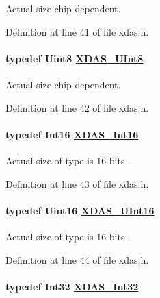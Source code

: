 Actual size chip dependent. 

Definition at line 41 of file xdas.h.\hypertarget{group__ti__xdais___x_d_a_s_gc9308edb855a360c27a47aaa6f3b39a9}{
\paragraph[XDAS\_\-UInt8]{\setlength{\rightskip}{0pt plus 5cm}typedef Uint8 \hyperlink{group__ti__xdais___x_d_a_s_gc9308edb855a360c27a47aaa6f3b39a9}{XDAS\_\-UInt8}}\hfill}
\label{group__ti__xdais___x_d_a_s_gc9308edb855a360c27a47aaa6f3b39a9}


Actual size chip dependent. 

Definition at line 42 of file xdas.h.\hypertarget{group__ti__xdais___x_d_a_s_g8189aa7a8636f505d6a35e5744ac6392}{
\paragraph[XDAS\_\-Int16]{\setlength{\rightskip}{0pt plus 5cm}typedef Int16 \hyperlink{group__ti__xdais___x_d_a_s_g8189aa7a8636f505d6a35e5744ac6392}{XDAS\_\-Int16}}\hfill}
\label{group__ti__xdais___x_d_a_s_g8189aa7a8636f505d6a35e5744ac6392}


Actual size of type is 16 bits. 

Definition at line 43 of file xdas.h.\hypertarget{group__ti__xdais___x_d_a_s_ga27605972947c862397ebee40c2ff917}{
\paragraph[XDAS\_\-UInt16]{\setlength{\rightskip}{0pt plus 5cm}typedef Uint16 \hyperlink{group__ti__xdais___x_d_a_s_ga27605972947c862397ebee40c2ff917}{XDAS\_\-UInt16}}\hfill}
\label{group__ti__xdais___x_d_a_s_ga27605972947c862397ebee40c2ff917}


Actual size of type is 16 bits. 

Definition at line 44 of file xdas.h.\hypertarget{group__ti__xdais___x_d_a_s_ge431579ed9eff9134de78ca00ddd5f3e}{
\paragraph[XDAS\_\-Int32]{\setlength{\rightskip}{0pt plus 5cm}typedef Int32 \hyperlink{group__ti__xdais___x_d_a_s_ge431579ed9eff9134de78ca00ddd5f3e}{XDAS\_\-Int32}}\hfill}
\label{group__ti__xdais___x_d_a_s_ge431579ed9eff9134de78ca00ddd5f3e}


